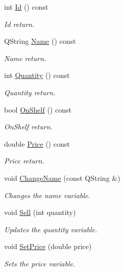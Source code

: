 \begin{DoxyCompactItemize}
int \hyperlink{class_item_a44199628f22d918876d21c415a545b0d}{Id} () const 
\begin{DoxyCompactList}\small\item\em Id return. \end{DoxyCompactList}\item 
Q\+String \hyperlink{class_item_a591cfd33ce61df595047b45a4fdec052}{Name} () const 
\begin{DoxyCompactList}\small\item\em Name return. \end{DoxyCompactList}\item 
int \hyperlink{class_item_a2fe9750d2081ea58d178e1d4d7200eda}{Quantity} () const 
\begin{DoxyCompactList}\small\item\em Quantity return. \end{DoxyCompactList}\item 
bool \hyperlink{class_item_a782f7033019bf2dffe30d27dc830d446}{On\+Shelf} () const 
\begin{DoxyCompactList}\small\item\em On\+Shelf return. \end{DoxyCompactList}\item 
double \hyperlink{class_item_a1f28bb50a19ccdd33bb13dab395e444e}{Price} () const 
\begin{DoxyCompactList}\small\item\em Price return. \end{DoxyCompactList}\item 
void \hyperlink{class_item_a0894d05d3d755dfae05494f1a8c6ed75}{Change\+Name} (const Q\+String \&)
\begin{DoxyCompactList}\small\item\em Changes the name variable. \end{DoxyCompactList}\item 
void \hyperlink{class_item_a03941b16bdef3fc193504bf3d0dda7bc}{Sell} (int quantity)
\begin{DoxyCompactList}\small\item\em Updates the quantity variable. \end{DoxyCompactList}\item 
void \hyperlink{class_item_a28b95f7ff02f2aaed53ad0b555093564}{Set\+Price} (double price)
\begin{DoxyCompactList}\small\item\em Sets the price variable. \end{DoxyCompactList}\item 

\end{DoxyCompactItemize}

